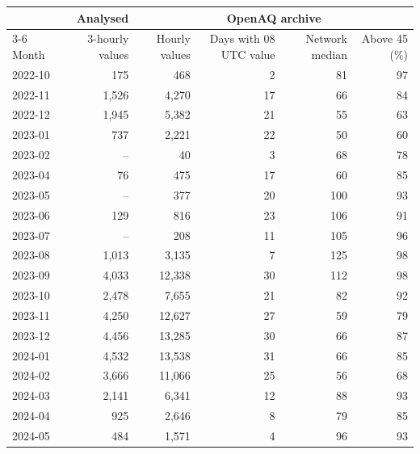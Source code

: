 \begin{tabular}{lrrrrr}\toprule
& Analysed & \multicolumn{4}{c}{OpenAQ archive} \\ \cmidrule(lr){3-6}
Month & 3-hourly values & Hourly values & Days with 08 UTC value & Network median & Above 45 (\%) \\ \midrule
2022-10 & 175 & 468 & 2 & 81 & 97 \\
2022-11 & 1{,}526 & 4{,}270 & 17 & 66 & 84 \\
2022-12 & 1{,}945 & 5{,}382 & 21 & 55 & 63 \\
2023-01 & 737 & 2{,}221 & 22 & 50 & 60 \\
2023-02 & -- & 40 & 3 & 68 & 78 \\
2023-04 & 76 & 475 & 17 & 60 & 85 \\
2023-05 & -- & 377 & 20 & 100 & 93 \\
2023-06 & 129 & 816 & 23 & 106 & 91 \\
2023-07 & -- & 208 & 11 & 105 & 96 \\
2023-08 & 1{,}013 & 3{,}135 & 7 & 125 & 98 \\
2023-09 & 4{,}033 & 12{,}338 & 30 & 112 & 98 \\
2023-10 & 2{,}478 & 7{,}655 & 21 & 82 & 92 \\
2023-11 & 4{,}250 & 12{,}627 & 27 & 59 & 79 \\
2023-12 & 4{,}456 & 13{,}285 & 30 & 66 & 87 \\
2024-01 & 4{,}532 & 13{,}538 & 31 & 66 & 85 \\
2024-02 & 3{,}666 & 11{,}066 & 25 & 56 & 68 \\
2024-03 & 2{,}141 & 6{,}341 & 12 & 88 & 93 \\
2024-04 & 925 & 2{,}646 & 8 & 79 & 85 \\
2024-05 & 484 & 1{,}571 & 4 & 96 & 93 \\
\bottomrule\end{tabular}
